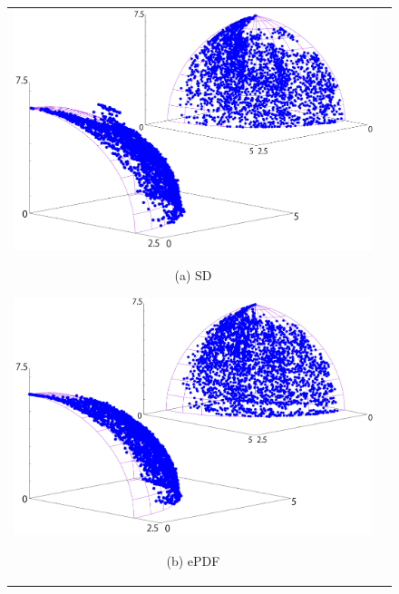 \documentclass[../main/main]{subfiles}
\begin{document}
\begin{figure}[htbp]
\begin{tabular}{cc}
\begin{minipage}{0.33\hsize}
\includegraphics[width=1\linewidth]{../figures/WFG7_sd_double.pdf}
\begin{center}
{\footnotesize (a) SD}
\end{center}
\end{minipage}
\begin{minipage}{0.33\hsize}
\includegraphics[width=1\linewidth]{../figures/WFG7_kde_double.pdf}
\begin{center}
{\footnotesize (b) ePDF}
\end{center}
\end{minipage}
\begin{minipage}{0.33\hsize}

\end{minipage}
\end{tabular}
\end{figure}
\end{document}

